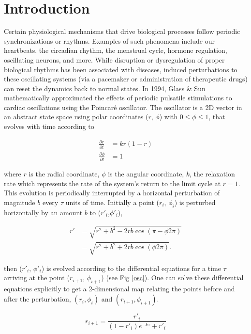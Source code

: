 \setlength{\parindent}{2em}

\section{Introduction}
\indent Certain physiological mechanisms that drive biological processes follow periodic synchronizations or rhythms. Examples of such phenomena include our heartbeats, the circadian rhythm, the menstrual cycle, hormone regulation, oscillating neurons, and more. While disruption or dysregulation of proper biological rhythms has been associated with diseases, induced perturbations to these oscillating systems (via a pacemaker or administration of therapeutic drugs) can reset the dynamics back to normal states\supercite{Glass2001}. 
\indent In 1994, Glass \& Sun\supercite{GLASS1994} mathematically approximated the effects of periodic pulsatile stimulations to cardiac oscillations using the Poincaré oscillator. The oscillator is a 2D vector in an abstract state space using polar coordinates ($r$, $\phi$) with $0\leq \phi \leq 1$, that evolves with time according to

\begin{align}
   \frac{\partial r}{\partial t} &= kr(1-r)\\ \frac{\partial \phi}{\partial t}&=1
\end{align}

\noindent where $r$ is the radial coordinate, $\phi$ is the angular coordinate, $k$, the relaxation rate which represents the rate of the system's return to the limit cycle at $r=1$. This evolution is periodically interrupted by a horizontal perturbation of magnitude $b$ every $\tau$ units of time. Initially a point ($r_i$, $\phi_i$) is perturbed horizontally by an amount $b$ to ($r'_i$,$\phi'_i$), 

\begin{align}
    r'&=\sqrt{r^2+b^2-2rb\cos(\pi-\phi 2\pi)}\\
     &=\sqrt{r^2+b^2+2rb\cos(\phi 2\pi)} 
     \label{eq: r}.
\end{align}

then ($r'_i$, $\phi'_i$) is evolved according to the differential equations for a time $\tau$ arriving at the point ($r_{i+1}$, $\phi_{i+1}$) (see Fig \ref{osc}). One can solve these differential equations explicitly to get a 2-dimensional map relating the points before and after the perturbation, $(r_i, \phi_i)$ and $(r_{i+1}, \phi_{i+1})$.

\begin{equation}
    r_{i+1} = \frac{r'_i}{(1 - r'_i)e^{-k\tau}+r'_i}
    \label{eqn:1}
\end{equation}

